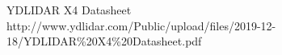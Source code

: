 \begin{thebibliography}{9}

   YDLIDAR X4 Datasheet\\
    http://www.ydlidar.com/Public/upload/files/2019-12-18/YDLIDAR\%20X4\%20Datasheet.pdf
\end{thebibliography}